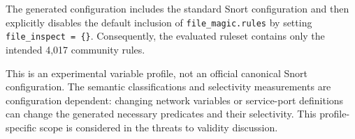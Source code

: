 \documentclass{article}
\begin{document}
The generated configuration includes the standard Snort configuration and
then explicitly disables the default inclusion of
\texttt{file\_magic.rules} by setting \verb|file_inspect = {}|.
Consequently, the evaluated ruleset contains only the intended 4,017
community rules.

This is an experimental variable profile, not an official canonical Snort
configuration. The semantic classifications and selectivity measurements are
configuration dependent: changing network variables or service-port
definitions can change the generated necessary predicates and their
selectivity. This profile-specific scope is considered in the threats to
validity discussion.


\end{document}
